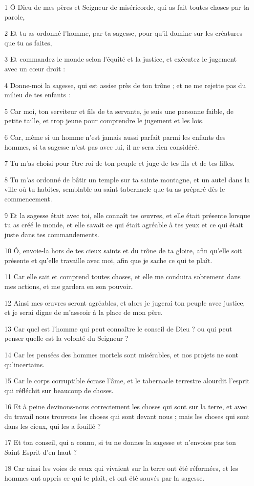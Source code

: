 \par 1 Ô Dieu de mes pères et Seigneur de miséricorde, qui as fait toutes choses par ta parole,
\par 2 Et tu as ordonné l'homme, par ta sagesse, pour qu'il domine sur les créatures que tu as faites,
\par 3 Et commandez le monde selon l'équité et la justice, et exécutez le jugement avec un cœur droit :
\par 4 Donne-moi la sagesse, qui est assise près de ton trône ; et ne me rejette pas du milieu de tes enfants :
\par 5 Car moi, ton serviteur et fils de ta servante, je suis une personne faible, de petite taille, et trop jeune pour comprendre le jugement et les lois.
\par 6 Car, même si un homme n'est jamais aussi parfait parmi les enfants des hommes, si ta sagesse n'est pas avec lui, il ne sera rien considéré.
\par 7 Tu m'as choisi pour être roi de ton peuple et juge de tes fils et de tes filles.
\par 8 Tu m'as ordonné de bâtir un temple sur ta sainte montagne, et un autel dans la ville où tu habites, semblable au saint tabernacle que tu as préparé dès le commencement.
\par 9 Et la sagesse était avec toi, elle connaît tes œuvres, et elle était présente lorsque tu as créé le monde, et elle savait ce qui était agréable à tes yeux et ce qui était juste dans tes commandements.
\par 10 Ô, envoie-la hors de tes cieux saints et du trône de ta gloire, afin qu'elle soit présente et qu'elle travaille avec moi, afin que je sache ce qui te plaît.
\par 11 Car elle sait et comprend toutes choses, et elle me conduira sobrement dans mes actions, et me gardera en son pouvoir.
\par 12 Ainsi mes œuvres seront agréables, et alors je jugerai ton peuple avec justice, et je serai digne de m'asseoir à la place de mon père.
\par 13 Car quel est l'homme qui peut connaître le conseil de Dieu ? ou qui peut penser quelle est la volonté du Seigneur ?
\par 14 Car les pensées des hommes mortels sont misérables, et nos projets ne sont qu'incertains.
\par 15 Car le corps corruptible écrase l'âme, et le tabernacle terrestre alourdit l'esprit qui réfléchit sur beaucoup de choses.
\par 16 Et à peine devinons-nous correctement les choses qui sont sur la terre, et avec du travail nous trouvons les choses qui sont devant nous ; mais les choses qui sont dans les cieux, qui les a fouillé ?
\par 17 Et ton conseil, qui a connu, si tu ne donnes la sagesse et n'envoies pas ton Saint-Esprit d'en haut ?
\par 18 Car ainsi les voies de ceux qui vivaient sur la terre ont été réformées, et les hommes ont appris ce qui te plaît, et ont été sauvés par la sagesse.

